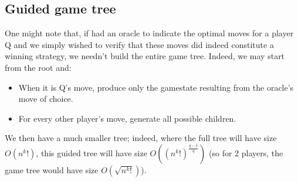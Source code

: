 \documentclass[12pt,a4paper]{article}
\begin{document}
\subsection*{Guided game tree}
One might note that, if had an oracle to indicate the optimal moves for a player Q and we simply wished to verify that these moves did indeed constitute a winning strategy, we needn't build the entire game tree. Indeed, we may start from the root and:
\begin{itemize}\itemsep0pt
\item When it is Q's move, produce only the gamestate resulting from the oracle's move of choice.
\item For every other player's move, generate all possible children.
\end{itemize}
We then have a much smaller tree; indeed, where the full tree will have size $O(n^k!)$,  this guided tree will have size $O((n^k!)^{\frac{q-1}{q}})$ (so for 2 players, the game tree would have size $O(\sqrt{n^k!})$).
\end{document}
